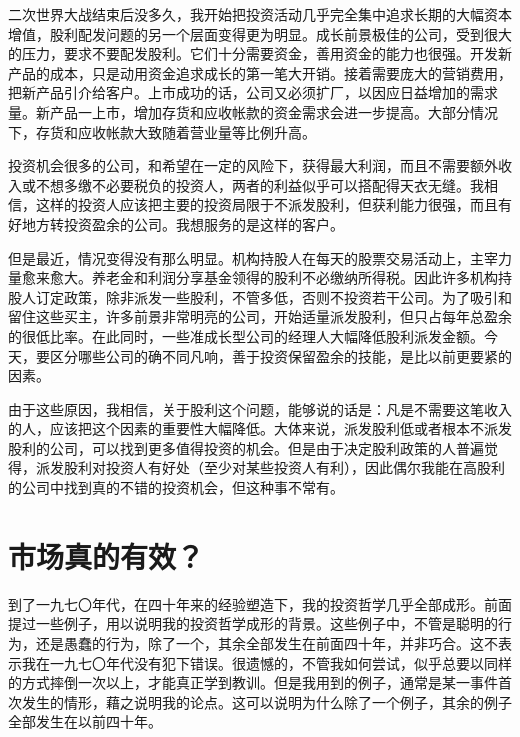 \documentclass[UTF8,a4paper,zihao=-4,fontset = windows]{ctexart} %
\begin{document}
二次世界大战结束后没多久，我开始把投资活动几乎完全集中追求长期的大幅资本增值，股利配发问题的另一个层面变得更为明显。成长前景极佳的公司，受到很大的压力，要求不要配发股利。它们十分需要资金，善用资金的能力也很强。开发新产品的成本，只是动用资金追求成长的第一笔大开销。接着需要庞大的营销费用，把新产品引介给客户。上市成功的话，公司又必须扩厂，以因应日益增加的需求量。新产品一上市，增加存货和应收帐款的资金需求会进一步提高。大部分情况下，存货和应收帐款大致随着营业量等比例升高。

投资机会很多的公司，和希望在一定的风险下，获得最大利润，而且不需要额外收入或不想多缴不必要税负的投资人，两者的利益似乎可以搭配得天衣无缝。我相信，这样的投资人应该把主要的投资局限于不派发股利，但获利能力很强，而且有好地方转投资盈余的公司。我想服务的是这样的客户。

但是最近，情况变得没有那么明显。机构持股人在每天的股票交易活动上，主宰力量愈来愈大。养老金和利润分享基金领得的股利不必缴纳所得税。因此许多机构持股人订定政策，除非派发一些股利，不管多低，否则不投资若干公司。为了吸引和留住这些买主，许多前景非常明亮的公司，开始适量派发股利，但只占每年总盈余的很低比率。在此同时，一些准成长型公司的经理人大幅降低股利派发金额。今天，要区分哪些公司的确不同凡响，善于投资保留盈余的技能，是比以前更要紧的因素。

由于这些原因，我相信，关于股利这个问题，能够说的话是：凡是不需要这笔收入的人，应该把这个因素的重要性大幅降低。大体来说，派发股利低或者根本不派发股利的公司，可以找到更多值得投资的机会。但是由于决定股利政策的人普遍觉得，派发股利对投资人有好处（至少对某些投资人有利），因此偶尔我能在高股利的公司中找到真的不错的投资机会，但这种事不常有。

\section{市场真的有效？}

到了一九七〇年代，在四十年来的经验塑造下，我的投资哲学几乎全部成形。前面提过一些例子，用以说明我的投资哲学成形的背景。这些例子中，不管是聪明的行为，还是愚蠢的行为，除了一个，其余全部发生在前面四十年，并非巧合。这不表示我在一九七〇年代没有犯下错误。很遗憾的，不管我如何尝试，似乎总要以同样的方式摔倒一次以上，才能真正学到教训。但是我用到的例子，通常是某一事件首次发生的情形，藉之说明我的论点。这可以说明为什么除了一个例子，其余的例子全部发生在以前四十年。
\end{document}
